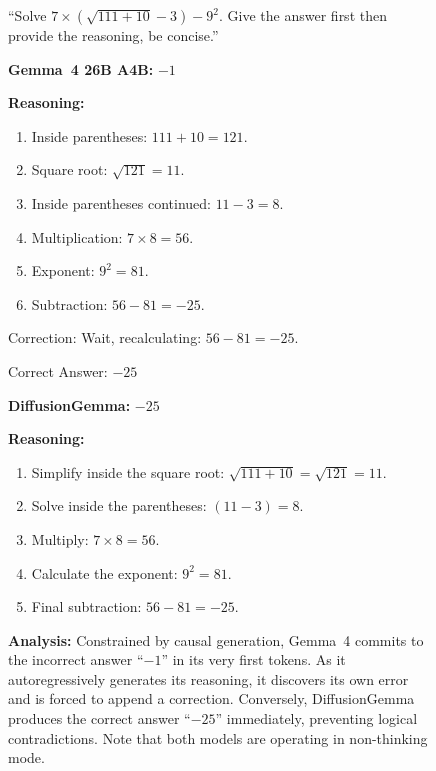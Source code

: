 \documentclass[11pt, a4paper, logo, copyright, gdm]{google}
\begin{document}
\begin{figure}[htbp]
\begin{tcolorbox}[
  colback=gray!5,
  colframe=gray!50,
  fontupper=\small,
  title={\sffamily\bfseries Prompt}
]
``Solve $7 \times (\sqrt{111 + 10} - 3) - 9^2$. Give the answer first
then provide the reasoning, be concise.''

\medskip
\begin{tcolorbox}[colback=red!3, colframe=red!25, boxrule=0.4pt, left=4pt, right=4pt]
\textbf{Gemma~4 26B A4B:}
$-1$

\textbf{Reasoning:}
\begin{enumerate}[nosep, leftmargin=1.5em]
  \item Inside parentheses: $111 + 10 = 121$.
  \item Square root: $\sqrt{121} = 11$.
  \item Inside parentheses continued: $11 - 3 = 8$.
  \item Multiplication: $7 \times 8 = 56$.
  \item Exponent: $9^2 = 81$.
  \item Subtraction: $56 - 81 = -25$.
\end{enumerate}
Correction: Wait, recalculating: $56 - 81 = -25$.

Correct Answer: $-25$
\end{tcolorbox}

\smallskip
\begin{tcolorbox}[colback=green!3, colframe=green!30, boxrule=0.4pt, left=4pt, right=4pt]
\textbf{DiffusionGemma:}
$-25$

\textbf{Reasoning:}
\begin{enumerate}[nosep, leftmargin=1.5em]
  \item Simplify inside the square root: $\sqrt{111 + 10} = \sqrt{121} = 11$.
  \item Solve inside the parentheses: $(11 - 3) = 8$.
  \item Multiply: $7 \times 8 = 56$.
  \item Calculate the exponent: $9^2 = 81$.
  \item Final subtraction: $56 - 81 = -25$.
\end{enumerate}
\end{tcolorbox}

\smallskip
{\footnotesize \textbf{Analysis:} Constrained by causal generation, Gemma~4 commits to the incorrect answer ``$-1$'' in its very first tokens. As it autoregressively generates its reasoning, it discovers its own error and is forced to append a correction. Conversely, DiffusionGemma produces the correct answer ``$-25$'' immediately, preventing logical contradictions. Note that both models are operating in non-thinking mode.}
\end{tcolorbox}


\end{figure}
\end{document}

